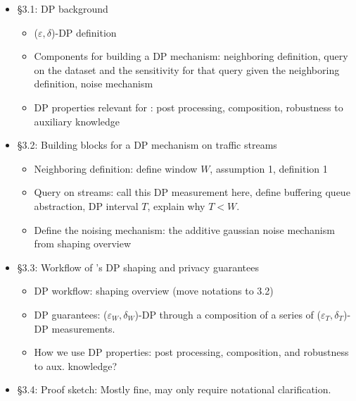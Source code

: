 \noindent
{}
\begin{itemize}
    \item \S 3.1: DP background
    \begin{itemize}
        \item ($\varepsilon, \delta$)-DP definition
        \item Components for building a DP mechanism: neighboring definition,
        query on the dataset and the sensitivity for that query given the
        neighboring definition, noise mechanism
        \item DP properties relevant for {\sys}: post processing, composition,
        robustness to auxiliary knowledge
    \end{itemize}
    \item \S 3.2: Building blocks for a DP mechanism on traffic streams
    \begin{itemize}
        \item Neighboring definition: define window $W$, assumption 1,
        definition 1
        \item Query on streams: call this DP measurement here, define buffering
        queue abstraction, DP interval $T$, explain why $T < W$.
        \item Define the noising mechanism: the additive gaussian noise
        mechanism from shaping overview
    \end{itemize}
    \item \S 3.3: Workflow of {\sys}'s DP shaping and privacy guarantees
    \begin{itemize}
        \item DP workflow: shaping overview (move notations to 3.2)
        \item DP guarantees: ($\varepsilon_W, \delta_W$)-DP through a
        composition of a series of ($\varepsilon_T, \delta_T$)-DP measurements.
        \item How we use DP properties: post processing, composition, and
        robustness to aux. knowledge?
    \end{itemize}
    \item \S 3.4: Proof sketch: Mostly fine, may only require notational
    clarification.
\end{itemize}
\fi


